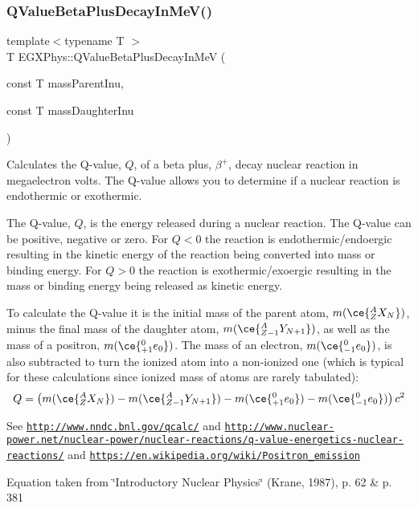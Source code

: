 \subsubsection{\texorpdfstring{Q\+Value\+Beta\+Plus\+Decay\+In\+Me\+V()}{QValueBetaPlusDecayInMeV()}}
{\footnotesize\ttfamily template$<$typename T $>$ \\
T E\+G\+X\+Phys\+::\+Q\+Value\+Beta\+Plus\+Decay\+In\+MeV (\begin{DoxyParamCaption}\item[{const T}]{mass\+Parent\+Inu,  }\item[{const T}]{mass\+Daughter\+Inu }\end{DoxyParamCaption})}



Calculates the Q-\/value, $Q$, of a beta plus, $\beta^+$, decay nuclear reaction in megaelectron volts. The Q-\/value allows you to determine if a nuclear reaction is endothermic or exothermic. 

The Q-\/value, $Q$, is the energy released during a nuclear reaction. The Q-\/value can be positive, negative or zero. For $Q < 0$ the reaction is endothermic/endoergic resulting in the kinetic energy of the reaction being converted into mass or binding energy. For $Q > 0$ the reaction is exothermic/exoergic resulting in the mass or binding energy being released as kinetic energy.

To calculate the Q-\/value it is the initial mass of the parent atom, $m(\ce{ ^{A}_{Z}X_{N} })$, minus the final mass of the daughter atom, $m(\ce{ ^{A}_{Z -1}Y_{N +1} })$, as well as the mass of a positron, $m(\ce{ ^{0}_{+1}e_{0} })$. The mass of an electron, $m(\ce{ ^{0}_{-1}e_{0} })$, is also subtracted to turn the ionized atom into a non-\/ionized one (which is typical for these calculations since ionized mass of atoms are rarely tabulated)\+: \[Q = \left ( m(\ce{ ^{A}_{Z}X_{N} })-m(\ce{ ^{A}_{Z -1}Y_{N +1} })-m(\ce{ ^{0}_{+1}e_{0} }) - m(\ce{ ^{0}_{-1}e_{0} }) \right) c^2\]

See \href{http://www.nndc.bnl.gov/qcalc/}{\tt http\+://www.\+nndc.\+bnl.\+gov/qcalc/} and \href{http://www.nuclear-power.net/nuclear-power/nuclear-reactions/q-value-energetics-nuclear-reactions/}{\tt http\+://www.\+nuclear-\/power.\+net/nuclear-\/power/nuclear-\/reactions/q-\/value-\/energetics-\/nuclear-\/reactions/} and \href{https://en.wikipedia.org/wiki/Positron_emission}{\tt https\+://en.\+wikipedia.\+org/wiki/\+Positron\+\_\+emission}

Equation taken from \char`\"{}\+Introductory Nuclear Physics\char`\"{} (Krane, 1987), p. 62 \& p. 381


